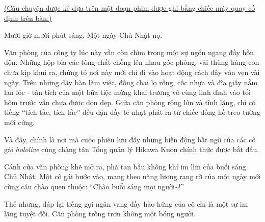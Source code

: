 \documentclass[../main.tex]{subfiles}
\begin{document}

\begin{center}
  \uline{(Câu chuyện được kể dựa trên một đoạn phim được ghi bằng chiếc máy quay cố định trên bàn.)}
\end{center}

Mười giờ mười phút sáng. Một ngày Chủ Nhật nọ.

Văn phòng của công ty lúc này vẫn còn chìm trong một sự ngổn ngang đầy hỗn độn. Những hộp bìa các-tông chất chồng lên nhau góc phòng, vài thùng hàng còn chưa kịp khui ra, chứng tỏ nơi này mới chỉ đi vào hoạt động cách đây vỏn vẹn vài ngày. Trên những dãy bàn làm việc, đống chai lọ rỗng, cốc nhựa và đĩa giấy nằm lăn lóc - tàn tích của một bữa tiệc mừng khai trương vô cùng linh đình vào tối hôm trước vẫn chưa được dọn dẹp. Giữa căn phòng rộng lớn và tĩnh lặng, chỉ có tiếng ``tích tắc, tích tắc'' đều đặn đầy tẻ nhạt phát ra từ chiếc đồng hồ treo tường mới cứng.

Và đây, chính là nơi mà cuộc phiêu lưu đầy những biến động bất ngờ của các cô gái \textit{hololive} cùng chàng tân Tổng quản lý Hikawa Kuon chính thức được bắt đầu.

\il


Cánh cửa văn phòng khẽ mở ra, phá tan bầu không khí im lìm của buổi sáng Chủ Nhật. Một cô gái bước vào, mang theo năng lượng rạng rỡ của một ngày mới cùng câu chào quen thuộc: ``Chào buổi sáng mọi người\~{}!''


Thế nhưng, đáp lại tiếng gọi ngân vang đầy hào hứng của cô chỉ là một sự im lặng tuyệt đối. Căn phòng trống trơn không một bóng người.
\end{document}
